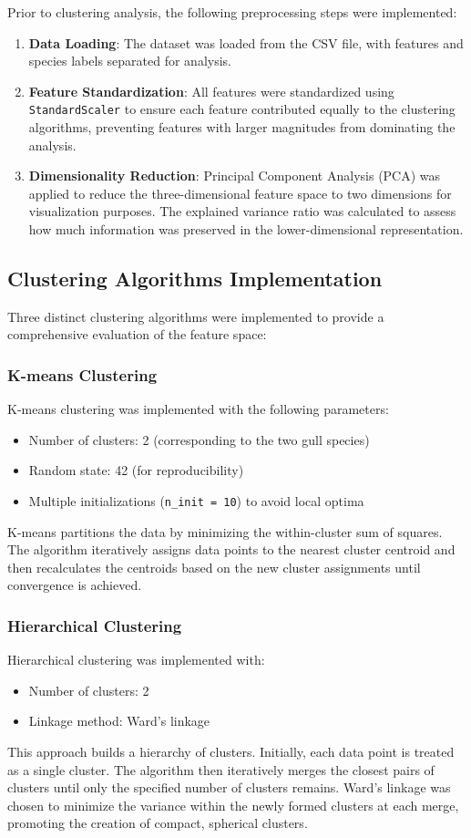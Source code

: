 \documentclass[a4paper,12pt]{report}
\begin{document}
Prior to clustering analysis, the following preprocessing steps were implemented:
\begin{enumerate}
    \item \textbf{Data Loading}: The dataset was loaded from the CSV file, with features and species labels separated for analysis.
    \item \textbf{Feature Standardization}: All features were standardized using \texttt{StandardScaler} to ensure each feature contributed equally to the clustering algorithms, preventing features with larger magnitudes from dominating the analysis.
    \item \textbf{Dimensionality Reduction}: Principal Component Analysis (PCA) was applied to reduce the three-dimensional feature space to two dimensions for visualization purposes. The explained variance ratio was calculated to assess how much information was preserved in the lower-dimensional representation.
\end{enumerate}

\subsection{Clustering Algorithms Implementation}
Three distinct clustering algorithms were implemented to provide a comprehensive evaluation of the feature space:

\subsubsection{K-means Clustering}
K-means clustering was implemented with the following parameters:
\begin{itemize}
    \item Number of clusters: 2 (corresponding to the two gull species)
    \item Random state: 42 (for reproducibility)
    \item Multiple initializations (\texttt{n\_init = 10}) to avoid local optima
\end{itemize}
K-means partitions the data by minimizing the within-cluster sum of squares. The algorithm iteratively assigns data points to the nearest cluster centroid and then recalculates the centroids based on the new cluster assignments until convergence is achieved.

\subsubsection{Hierarchical Clustering}
Hierarchical clustering was implemented with:
\begin{itemize}
    \item Number of clusters: 2
    \item Linkage method: Ward's linkage
\end{itemize}
This approach builds a hierarchy of clusters. Initially, each data point is treated as a single cluster.  The algorithm then iteratively merges the closest pairs of clusters until only the specified number of clusters remains. Ward's linkage was chosen to minimize the variance within the newly formed clusters at each merge, promoting the creation of compact, spherical clusters.
\end{document}
